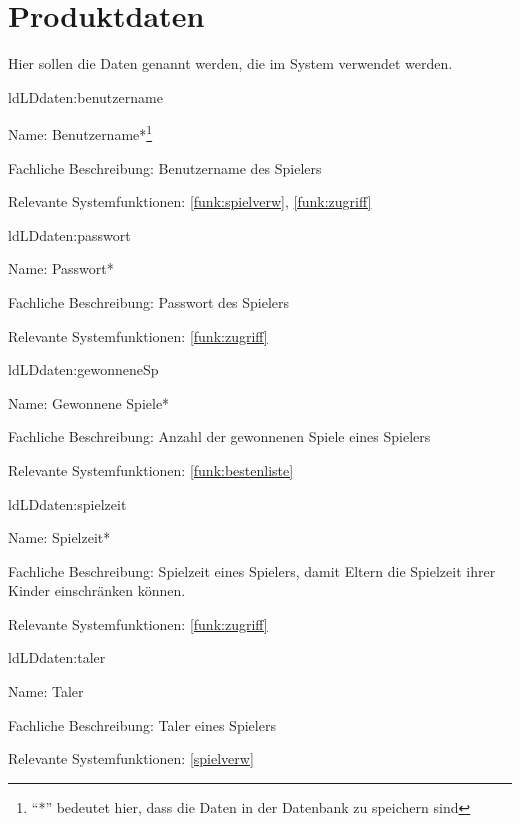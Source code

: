 
\section{Produktdaten}

Hier sollen die Daten genannt werden, die im System verwendet werden.

\setcounter{ld}{10}

\begin{description}[leftmargin=5em, style=sameline]
	
	\begin{lhp}{ld}{LD}{daten:benutzername}
		\item [Name:] Benutzername*\footnote{``*'' bedeutet hier, dass die Daten in der Datenbank zu speichern sind}
		\item [Fachliche Beschreibung:] Benutzername des Spielers
		\item [Relevante Systemfunktionen:] \ref{funk:spielverw}, \ref{funk:zugriff}
	\end{lhp}
	
	\begin{lhp}{ld}{LD}{daten:passwort}
		\item [Name:] Passwort*
		\item [Fachliche Beschreibung:] Passwort des Spielers
		\item [Relevante Systemfunktionen:] \ref{funk:zugriff}
	\end{lhp}

	\begin{lhp}{ld}{LD}{daten:gewonneneSp}
		\item [Name:] Gewonnene Spiele*
		\item [Fachliche Beschreibung:] Anzahl der gewonnenen Spiele eines Spielers
		\item [Relevante Systemfunktionen:] \ref{funk:bestenliste}
	\end{lhp}

	\begin{lhp}{ld}{LD}{daten:spielzeit}
		\item [Name:] Spielzeit*
		\item [Fachliche Beschreibung:] Spielzeit eines Spielers, damit Eltern die Spielzeit ihrer Kinder einschränken können.
		\item [Relevante Systemfunktionen:] \ref{funk:zugriff}
	\end{lhp}

	\begin{lhp}{ld}{LD}{daten:taler}
		\item [Name:] Taler
		\item [Fachliche Beschreibung:] Taler eines Spielers
		\item [Relevante Systemfunktionen:] \ref{spielverw}
	\end{lhp}


\end{description}
